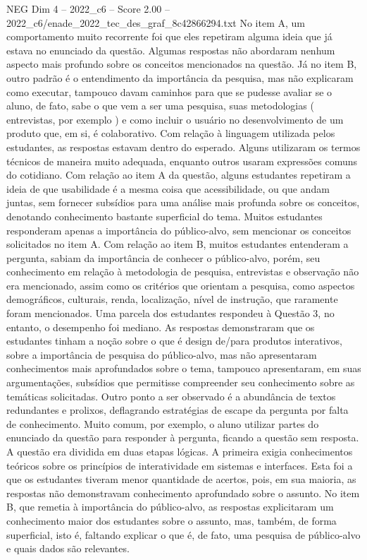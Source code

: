\begin{textsample}{NEG Dim 4 – 2022\_c6 – Score 2.00 – 2022\_c6/enade\_2022\_tec\_des\_graf\_8c42866294.txt}
No item A, um comportamento muito recorrente foi que eles repetiram alguma ideia que já estava no enunciado da questão.
Algumas respostas não abordaram nenhum aspecto mais profundo sobre os conceitos mencionados na questão.
Já no item B, outro padrão é o entendimento da importância da pesquisa, mas não explicaram como executar, tampouco davam caminhos para que se pudesse avaliar se o aluno, de fato, sabe o que vem a ser uma pesquisa, suas metodologias ( entrevistas, por exemplo ) e como incluir o usuário no desenvolvimento de um produto que, em si, é colaborativo.
Com relação à linguagem utilizada pelos estudantes, as respostas estavam dentro do esperado.
Alguns utilizaram os termos técnicos de maneira muito adequada, enquanto outros usaram expressões comuns do cotidiano.
Com relação ao item A da questão, alguns estudantes repetiram a ideia de que usabilidade é a mesma coisa que acessibilidade, ou que andam juntas, sem fornecer subsídios para uma análise mais profunda sobre os conceitos, denotando conhecimento bastante superficial do tema.
Muitos estudantes responderam apenas a importância do público-alvo, sem mencionar os conceitos solicitados no item A.
Com relação ao item B, muitos estudantes entenderam a pergunta, sabiam da importância de conhecer o público-alvo, porém, seu conhecimento em relação à metodologia de pesquisa, entrevistas e observação não era mencionado, assim como os critérios que orientam a pesquisa, como aspectos demográficos, culturais, renda, localização, nível de instrução, que raramente foram mencionados.
Uma parcela dos estudantes respondeu à Questão 3, no entanto, o desempenho foi mediano.
As respostas demonstraram que os estudantes tinham a noção sobre o que é design de/para produtos interativos, sobre a importância de pesquisa do público-alvo, mas não apresentaram conhecimentos mais aprofundados sobre o tema, tampouco apresentaram, em suas argumentações, subsídios que permitisse compreender seu conhecimento sobre as temáticas solicitadas.
Outro ponto a ser observado é a abundância de textos redundantes e prolixos, deflagrando estratégias de escape da pergunta por falta de conhecimento.
Muito comum, por exemplo, o aluno utilizar partes do enunciado da questão para responder à pergunta, ficando a questão sem resposta.
A questão era dividida em duas etapas lógicas.
A primeira exigia conhecimentos teóricos sobre os princípios de interatividade em sistemas e interfaces.
Esta foi a que os estudantes tiveram menor quantidade de acertos, pois, em sua maioria, as respostas não demonstravam conhecimento aprofundado sobre o assunto.
No item B, que remetia à importância do público-alvo, as respostas explicitaram um conhecimento maior dos estudantes sobre o assunto, mas, também, de forma superficial, isto é, faltando explicar o que é, de fato, uma pesquisa de público-alvo e quais dados são relevantes.

\end{textsample}

